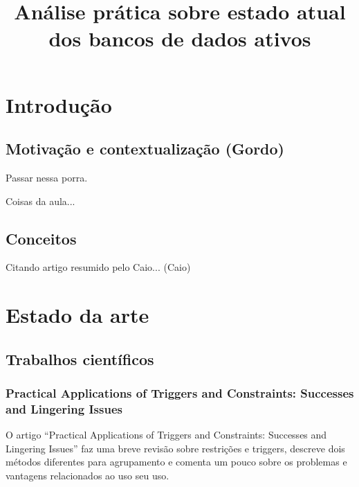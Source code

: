 \documentclass[conference]{IEEEtran}
\begin{document}
\title{Análise prática sobre estado atual dos bancos de dados ativos}

\author{
}

\maketitle
\IEEEpeerreviewmaketitle

\section{Introdução}
  \subsection{Motivação e contextualização (Gordo)}
	Passar nessa porra.

  Coisas da aula...

  \subsection{Conceitos}
  Citando artigo resumido pelo Caio... (Caio)

\section{Estado da arte}
  \subsection{Trabalhos científicos}
    \subsubsection{Practical Applications of Triggers and Constraints: Successes and Lingering Issues}
    O artigo “Practical Applications of Triggers and Constraints: Successes and Lingering Issues” faz uma breve revisão sobre restrições e triggers, descreve dois métodos diferentes para agrupamento e comenta um pouco sobre os problemas e vantagens relacionados ao uso seu uso.
\end{document}

